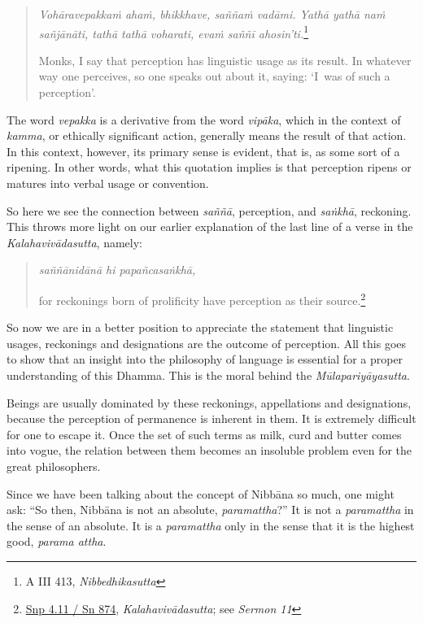 \begin{quote}
\emph{Vohāravepakkaṁ ahaṁ, bhikkhave, saññaṁ vadāmi. Yathā yathā naṁ sañjānāti, tathā tathā voharati, evaṁ saññī ahosin'ti.}\footnote{A III 413, \emph{Nibbedhikasutta}}

Monks, I say that perception has linguistic usage as its result. In whatever way one perceives, so one speaks out about it, saying: `I~was of such a perception'.
\end{quote}

The word \emph{vepakka} is a derivative from the word \emph{vipāka}, which in the context of \emph{kamma}, or ethically significant action, generally means the result of that action. In this context, however, its primary sense is evident, that is, as some sort of a ripening. In other words, what this quotation implies is that perception ripens or matures into verbal usage or convention.

So here we see the connection between \emph{saññā}, perception, and \emph{saṅkhā}, reckoning. This throws more light on our earlier explanation of the last line of a verse in the \emph{Kalahavivādasutta}, namely:

\begin{quote}
\emph{saññānidānā hi papañcasaṅkhā,}

for reckonings born of prolificity have perception as their source.\footnote{\href{https://suttacentral.net/snp4.11/pli/ms}{Snp 4.11 / Sn 874}, \emph{Kalahavivādasutta}; see \emph{Sermon 11}}
\end{quote}

So now we are in a better position to appreciate the statement that linguistic usages, reckonings and designations are the outcome of perception. All this goes to show that an insight into the philosophy of language is essential for a proper understanding of this Dhamma. This is the moral behind the \emph{Mūlapariyāyasutta}.

Beings are usually dominated by these reckonings, appellations and designations, because the perception of permanence is inherent in them. It is extremely difficult for one to escape it. Once the set of such terms as milk, curd and butter comes into vogue, the relation between them becomes an insoluble problem even for the great philosophers.

Since we have been talking about the concept of Nibbāna so much, one might ask: ``So then, Nibbāna is not an absolute, \emph{paramattha}?'' It is not a \emph{paramattha} in the sense of an absolute. It is a \emph{paramattha} only in the sense that it is the highest good, \emph{parama attha}.

